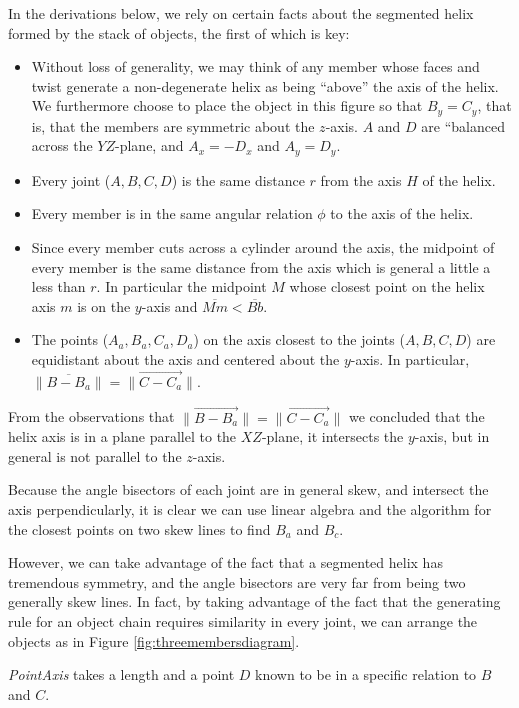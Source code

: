 \documentclass[11pt]{article}
\begin{document}
{In the derivations below, we rely on certain facts about
the segmented helix formed by the stack of objects, the first
of which is key:
\begin{itemize}
\item Without loss of generality, we may think of any member whose faces
  and twist generate a non-degenerate helix as being ``above'' the
  axis of the helix. We furthermore choose to place the object in
  this figure so that $B_y = C_y$, that is, that the members are symmetric
  about the $z$-axis.
  $A$ and $D$ are ``balanced across the $YZ$-plane,
  and $A_x = -D_x$ and $A_y = D_y$.
\item Every joint ($A,B,C,D$) is the same distance $r$ from the axis $H$ of the helix.
\item Every member is in the same angular relation $\phi$ to the axis of the helix.
\item Since every member cuts across a cylinder around the axis,
  the midpoint of every member is the same distance from the axis
  which is general a little a less than $r$. In particular the midpoint $M$
  whose closest point on the helix axis $m$ is on the $y$-axis and
  $\overline{Mm} < \overline{Bb}$.
\item The points ($A_a,B_a,C_a,D_a$) on the axis closest to the joints ($A,B,C,D$)
  are equidistant about the axis and centered about the $y$-axis. In
  particular, $\| \overline{B - B_a} \| = \| \overrightarrow{C - C_a} \|$.
\end{itemize}

From the observations that $\| \overrightarrow{B - B_a} \| = \| \overrightarrow{C - C_a} \|$
we concluded that the helix axis is in a plane
parallel to the $XZ$-plane, it intersects the $y$-axis, but in general is
not parallel to the $z$-axis.

Because the angle bisectors of each joint are in general skew, and intersect the
axis perpendicularly, it is clear we can use linear algebra and the algorithm
for the closest points on two skew lines to find $B_a$ and $B_c$.

However, we can take advantage of the fact that a segmented helix has
tremendous symmetry, and the angle bisectors are very far from being two
generally skew lines. In fact, by taking advantage of the fact that the
generating rule for an object chain requires similarity in every joint,
we can arrange the objects as in Figure \ref{fig:threemembersdiagram}.

{\em PointAxis} takes a length and a point $D$ known to be in
a specific relation to $B$ and $C$.

}
\end{document}
